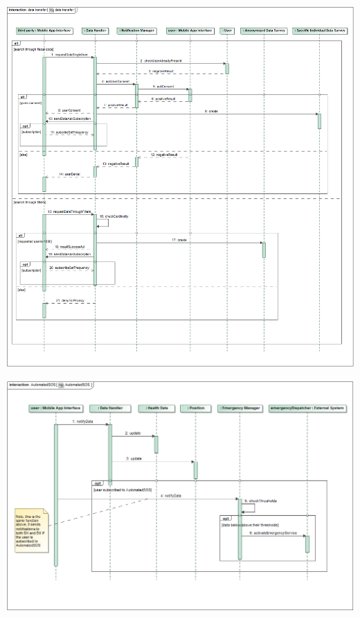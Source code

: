 \begin{center}
\includegraphics[scale=0.4]{sections/diagrams/data_transfer}
\newline
{}
\end{center}

\begin{center}
\includegraphics[scale=0.4]{sections/diagrams/AutomatedSOS}
\newline
{}
\end{center}

